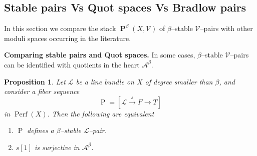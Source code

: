 \documentclass[11pt]{article}
\newtheorem{proposition}[theorem]{Proposition}
\newcommand{\abeta}{\mathcal{A}^{\beta}}
\newcommand{\perf}{\operatorname{Perf}(X)}
\newcommand{\framing}{\mathcal{V}}
\newcommand{\linebundle}{\mathcal{L}}
\newcommand{\pairs}{\boldsymbol{\operatorname{P}}^{\beta}(X,\mathcal{V})}
\begin{document}
\subsection{Stable pairs Vs Quot spaces Vs Bradlow pairs}\label{subsec : comparing with Quot}
In this section we compare the stack $\pairs$ of $\beta$--stable $\framing$--pairs with other moduli spaces occurring in the literature.
\bigskip

\noindent\textbf{Comparing stable pairs and Quot spaces.} In some cases, $\beta$--stable $\framing$--pairs can be identified with quotients in the heart $\abeta$.

    \begin{proposition}\label{prop : PairsQuot}
    Let $\linebundle$ be a line bundle on $X$ of degree smaller than $\beta$, and consider a fiber sequence
    \[
      \operatorname{P}=[\linebundle \xrightarrow{s} F\rightarrow T]  
    \]
    in $\perf$. Then the following are equivalent
    \begin{enumerate}
        \item\label{item : stpair} $\operatorname{P}$ defines a $\beta$--stable $\linebundle$--pair.
        \item\label{item : quotient} $s[1]$ is surjective in $\abeta$.
    \end{enumerate}
    
    \end{proposition}
\end{document}
